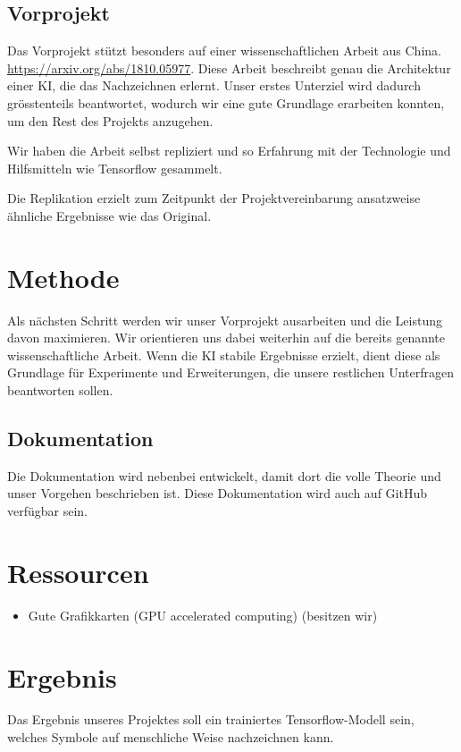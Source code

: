\documentclass{article}
\begin{document}
\subsection{Vorprojekt}
Das Vorprojekt stützt besonders auf einer wissenschaftlichen Arbeit aus China.
\url{https://arxiv.org/abs/1810.05977}. Diese Arbeit beschreibt genau die
Architektur einer KI, die das Nachzeichnen erlernt. Unser erstes Unterziel wird
dadurch grösstenteils beantwortet, wodurch wir eine gute Grundlage erarbeiten
konnten, um den Rest des Projekts anzugehen.

Wir haben die Arbeit selbst repliziert und so Erfahrung mit der Technologie und
Hilfsmitteln wie Tensorflow gesammelt.

Die Replikation erzielt zum Zeitpunkt der Projektvereinbarung ansatzweise
ähnliche Ergebnisse wie das Original.


\section{Methode}
\label{chap:methode}

Als nächsten Schritt werden wir unser Vorprojekt ausarbeiten und die Leistung
davon maximieren. Wir orientieren uns dabei weiterhin auf die bereits genannte
wissenschaftliche Arbeit. Wenn die KI stabile Ergebnisse erzielt, dient diese
als Grundlage für Experimente und Erweiterungen, die unsere restlichen
Unterfragen beantworten sollen. 


\subsection{Dokumentation}
\label{chap:m_dokumentation}
Die Dokumentation wird nebenbei entwickelt, damit dort die volle Theorie
und unser Vorgehen beschrieben ist. Diese Dokumentation wird auch auf GitHub
verfügbar sein. 


\section{Ressourcen}
\label{chap:ressourcen}

\begin{itemize}
    \item Gute Grafikkarten (GPU accelerated computing) (besitzen wir)
\end{itemize}


\section{Ergebnis}
\label{chap:ergebnis}
Das Ergebnis unseres Projektes soll ein trainiertes Tensorflow-Modell sein,
welches Symbole auf menschliche Weise nachzeichnen kann.
\end{document}
